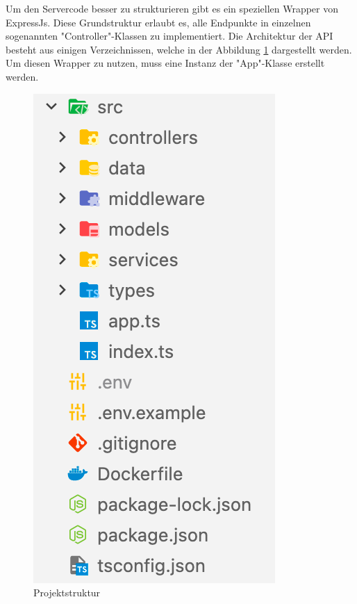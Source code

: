 
Um den Servercode besser zu strukturieren gibt es ein speziellen Wrapper von ExpressJs. Diese Grundstruktur erlaubt es, alle Endpunkte in einzelnen sogenannten "Controller"-Klassen zu implementiert. Die Architektur der API besteht aus einigen Verzeichnissen, welche in der Abbildung \ref{fig:apiStructure} dargestellt werden. Um diesen Wrapper zu nutzen, muss eine Instanz der "App"-Klasse erstellt werden.

\begin{figure}[H]
    \centering
    \includegraphics{media/APITemplate/ProjectStructure.png}
    \caption{Projektstruktur}
    \label{fig:apiStructure}
\end{figure}

\pagebreak









